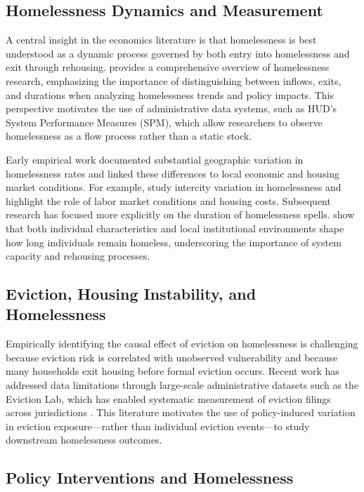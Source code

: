 \documentclass[12pt]{article}
\begin{document}
\subsection{Homelessness Dynamics and Measurement}

A central insight in the economics literature is that homelessness is best understood as a dynamic process governed by both entry into homelessness and exit through rehousing. \citet{oflaherty2019} provides a comprehensive overview of homelessness research, emphasizing the importance of distinguishing between inflows, exits, and durations when analyzing homelessness trends and policy impacts. This perspective motivates the use of administrative data systems, such as HUD’s System Performance Measures (SPM), which allow researchers to observe homelessness as a flow process rather than a static stock.

Early empirical work documented substantial geographic variation in homelessness rates and linked these differences to local economic and housing market conditions. For example, \citet{honigfiler1993} study intercity variation in homelessness and highlight the role of labor market conditions and housing costs. Subsequent research has focused more explicitly on the duration of homelessness spells. \citet{cobbclark2014} show that both individual characteristics and local institutional environments shape how long individuals remain homeless, underscoring the importance of system capacity and rehousing processes.

\subsection{Eviction, Housing Instability, and Homelessness}

Empirically identifying the causal effect of eviction on homelessness is challenging because eviction risk is correlated with unobserved vulnerability and because many households exit housing before formal eviction occurs. Recent work has addressed data limitations through large-scale administrative datasets such as the Eviction Lab, which has enabled systematic measurement of eviction filings across jurisdictions \citep{desmond2018}. This literature motivates the use of policy-induced variation in eviction exposure—rather than individual eviction events—to study downstream homelessness outcomes.

\subsection{Policy Interventions and Homelessness}
\end{document}
